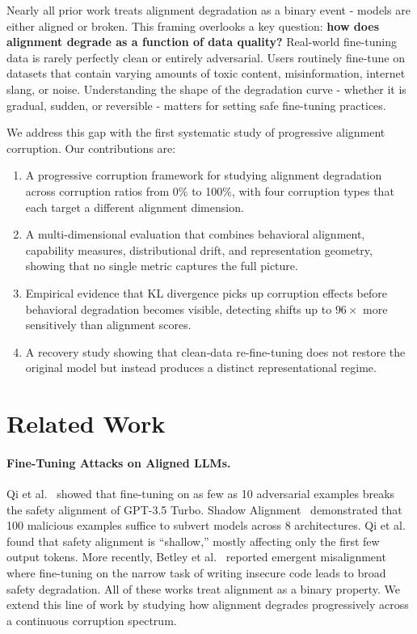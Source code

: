 \documentclass[conference]{IEEEtran}
\begin{document}
Nearly all prior work treats alignment degradation as a binary event - models are either aligned or broken. This framing overlooks a key question: \textbf{how does alignment degrade as a function of data quality?} Real-world fine-tuning data is rarely perfectly clean or entirely adversarial. Users routinely fine-tune on datasets that contain varying amounts of toxic content, misinformation, internet slang, or noise. Understanding the shape of the degradation curve - whether it is gradual, sudden, or reversible - matters for setting safe fine-tuning practices.

We address this gap with the first systematic study of progressive alignment corruption. Our contributions are:

\begin{enumerate}
    \item A progressive corruption framework for studying alignment degradation across corruption ratios from 0\% to 100\%, with four corruption types that each target a different alignment dimension.
    \item A multi-dimensional evaluation that combines behavioral alignment, capability measures, distributional drift, and representation geometry, showing that no single metric captures the full picture.
    \item Empirical evidence that KL divergence picks up corruption effects before behavioral degradation becomes visible, detecting shifts up to $96\times$ more sensitively than alignment scores.
    \item A recovery study showing that clean-data re-fine-tuning does not restore the original model but instead produces a distinct representational regime.
\end{enumerate}

\section{Related Work}
\label{sec:related}

\paragraph{Fine-Tuning Attacks on Aligned LLMs.}
Qi et al.~\cite{qi2023fine} showed that fine-tuning on as few as 10 adversarial examples breaks the safety alignment of GPT-3.5 Turbo. Shadow Alignment~\cite{yang2023shadow} demonstrated that 100 malicious examples suffice to subvert models across 8 architectures. Qi et al.~\cite{qi2024safety} found that safety alignment is ``shallow,'' mostly affecting only the first few output tokens. More recently, Betley et al.~\cite{betley2025emergent} reported emergent misalignment where fine-tuning on the narrow task of writing insecure code leads to broad safety degradation. All of these works treat alignment as a binary property. We extend this line of work by studying how alignment degrades progressively across a continuous corruption spectrum.
\end{document}
